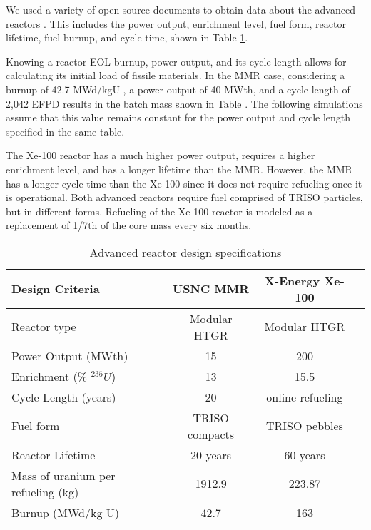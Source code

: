 We used a variety of open-source documents to obtain data about the advanced reactors
\cite{mitchell_usnc_2020, hawari_development_2018, venneri_neutronic_2015, 
harlan_x-energy_2018, hussain_advances_2018}. 
This includes 
the power output, enrichment level, fuel form, reactor lifetime, fuel 
burnup, and cycle time, shown in Table \ref{tab:reactor_summary}. 

Knowing a reactor \gls{EOL} burnup, power output, and its cycle length
allows for calculating its initial load of fissile materials.
In the MMR case, considering a burnup of 42.7 MWd/kgU \cite{hawari_development_2018},
a power output of 40 MWth, and a cycle length of 2,042 EFPD \cite{venneri_neutronic_2015}
results in the batch mass shown in Table \label{tab:reactor_summary}.
The following simulations assume that this value remains constant for the
power output and cycle length specified in the same table.

The Xe-100 reactor has a much higher power output, requires a higher enrichment 
level, and has a longer lifetime than the \gls{MMR}. However, the 
\gls{MMR} has a longer cycle time than the Xe-100 since it does not require 
refueling once it is operational. Both advanced reactors require fuel 
comprised of \gls{TRISO} particles, but in different forms. Refueling 
of the Xe-100 reactor is modeled as a replacement of 1/7th of the core mass 
every six months.  

\begin{table}[ht]
        \caption{Advanced reactor design specifications}
        \label{tab:reactor_summary}
        \begin{tabular}{l c c c}
            \hline
            Design Criteria & \gls{USNC} \gls{MMR} \cite{mitchell_usnc_2020}& 
                X-Energy Xe-100 \cite{harlan_x-energy_2018,hussain_advances_2018} \\\hline
            Reactor type & Modular HTGR & Modular HTGR \\
            Power Output (MWth) & 15 & 200 \\
            Enrichment (\% $^{235}U$) & 13 & 15.5 \\
            Cycle Length (years) & 20 & online refueling\\
            Fuel form & \gls{TRISO} compacts & \gls{TRISO} pebbles\\
            Reactor Lifetime & 20 years & 60 years \\
            Mass of uranium per refueling (kg) & 1912.9 & 223.87 \\
            Burnup (MWd/kg U) & 42.7 & 163 \\
            \hline
        \end{tabular}
    \end{table}

